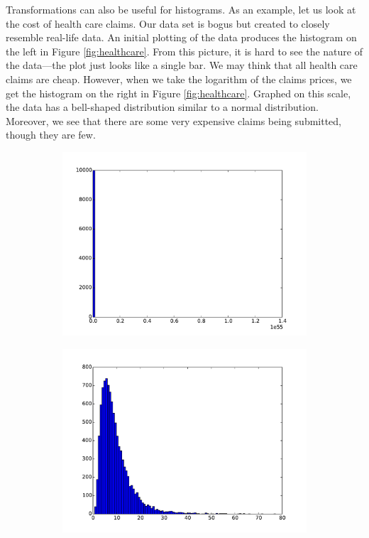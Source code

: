 Transformations can also be useful for histograms.
As an example, let us look at the cost of health care claims. 
Our data set is bogus but created to closely resemble real-life data. 
An initial plotting of the data produces the histogram on the left in Figure \ref{fig:healthcare}. 
From this picture, it is hard to see the nature of the data---the plot just looks like a single bar. 
We may think that all health care claims are cheap. 
However, when we take the logarithm of the claims prices, we get the histogram on the right in Figure \ref{fig:healthcare}. 
Graphed on this scale, the data has a bell-shaped distribution similar to a normal distribution. 
Moreover, we see that there are some very expensive claims being submitted, though they are few. 
\begin{figure}
\centering
\begin{subfigure}{.5\textwidth}
  \centering
  \includegraphics[width=\textwidth]{healthcare_linscale.pdf}
\end{subfigure}%
\begin{subfigure}{.5\textwidth}
  \centering
  \includegraphics[width=\textwidth]{healthcare_logscale.pdf}

\end{subfigure}
\end{figure}
